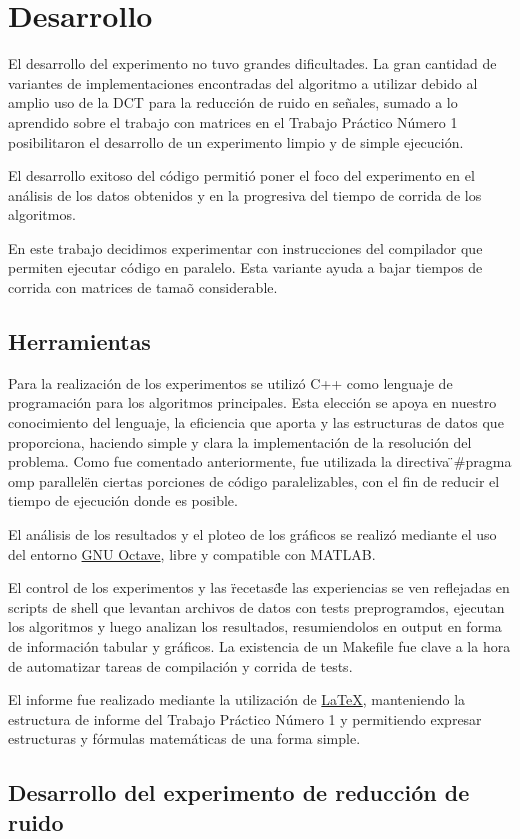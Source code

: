 
\section{Desarrollo}

El desarrollo del experimento no tuvo grandes dificultades. La gran cantidad de
variantes de implementaciones encontradas del algoritmo a utilizar debido al
amplio uso de la DCT para la reducci\'on de ruido en se\~nales, sumado a lo
aprendido sobre el trabajo con matrices en el Trabajo Pr\'actico N\'umero 1
posibilitaron el desarrollo de un experimento limpio y de simple ejecuci\'on.

El desarrollo exitoso del c\'odigo permiti\'o poner el foco del experimento en
el an\'alisis de los datos obtenidos y en la progresiva del tiempo de corrida
de los algoritmos.

En este trabajo decidimos experimentar con instrucciones del compilador que
permiten ejecutar c\'odigo en paralelo. Esta variante ayuda a bajar tiempos de
corrida con matrices de tama\~o considerable.

\subsection{Herramientas}

Para la realizaci\'on de los experimentos se utiliz\'o C++ como lenguaje de
programaci\'on para los algoritmos principales. Esta elecci\'on se apoya en
nuestro conocimiento del lenguaje, la eficiencia que aporta y las estructuras de
datos que proporciona, haciendo simple y clara la implementaci\'on de la
resoluci\'on del problema. Como fue comentado anteriormente, fue utilizada la
directiva \"#pragma omp parallel\" en ciertas porciones de c\'odigo
paralelizables, con el fin de reducir el tiempo de ejecuci\'on donde es posible.

El an\'alisis de los resultados y el ploteo de los gr\'aficos se realiz\'o
mediante el uso del entorno \href{http://www.gnu.org/software/octave/}{GNU
Octave}, libre y compatible con MATLAB.

El control de los experimentos y las \"recetas\" de las experiencias se ven
reflejadas en scripts de shell que levantan archivos de datos con tests
preprogramdos, ejecutan los algoritmos y luego analizan los resultados,
resumiendolos en output en forma de informaci\'on tabular y gr\'aficos.
La existencia de un Makefile fue clave a la hora de automatizar tareas de
compilaci\'on y corrida de tests.

El informe fue realizado mediante la utilizaci\'on de \href{http://www.latex-project.org/}{LaTeX},
 manteniendo la estructura de informe del Trabajo Pr\'actico N\'umero 1 y
permitiendo expresar estructuras y f\'ormulas matem\'aticas de una forma simple.

\subsection{Desarrollo del experimento de reducci\'on de ruido}

